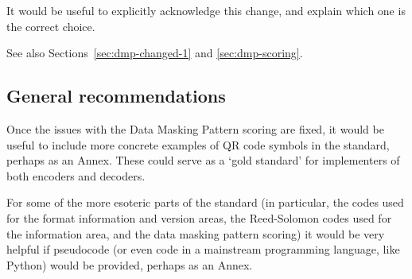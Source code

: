 \documentclass[a4paper,twoside]{article}
\begin{document}
It would be useful to explicitly acknowledge this change, and explain which one is the correct choice.

See also Sections~\ref{sec:dmp-changed-1} and \ref{sec:dmp-scoring}.

\subsection{General recommendations}

Once the issues with the Data Masking Pattern scoring are fixed, it would be useful to include more concrete examples
of QR code symbols in the standard, perhaps as an Annex. These could serve as a `gold standard' for implementers of both
encoders and decoders.

For some of the more esoteric parts of the standard (in particular, the codes used for the format information and version areas,
the Reed-Solomon codes used for the information area, and the data masking pattern scoring) it would be very helpful if pseudocode
(or even code in a mainstream programming language, like Python) would be provided, perhaps as an Annex.
\end{document}
